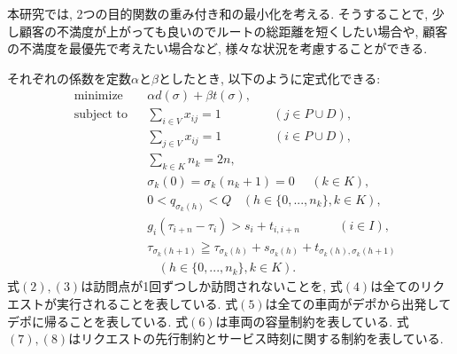 本研究では, 2つの目的関数の重み付き和の最小化を考える. そうすることで, 少し顧客の不満度が上がっても良いのでルートの総距離を短くしたい場合や, 顧客の不満度を最優先で考えたい場合など, 様々な状況を考慮することができる.

それぞれの係数を定数$\alpha$と$\beta$としたとき, 以下のように定式化できる:
\begin{align*}
  &\textrm{minimize}   &&
  \alpha d(\sigma)+ \beta t(\sigma),\tag{1}\\
  &\textrm{subject to} && \sum_{i \in V} x_{ij} = 1 \ \ \ \ \ \ \ \ \ \ \ \ \ \ \ \ \ \ \ (j \in  P \cup D), \tag{2}\\
  &                    && \sum_{j \in V} x_{ij} = 1 \ \ \ \ \ \ \ \ \ \ \ \ \ \ \ \ \ \ \ (i \in  P \cup D), \tag{3}\\
  &                    && \sum_{k \in K} n_k = 2n,\tag{4}\\
  &                    && \sigma_k(0) = \sigma_k(n_k+1) = 0 \ \ \ \ \ \ (k \in K),\tag{5}\\
  &                    && 0 < q_{\sigma_k(h)} < Q\ \ \ \
  (h \in \{0,...,n_k\},k \in K),\tag{6}\\
  &                    && g_i(\tau_{i+n}-\tau_i) > s_i + t_{i,i+n}\ \ \ \ \ \ \ \ \ \ \ \ \ \  (i \in I),\tag{7}\\
  &                    && \tau_ {\sigma_k (h+1)} \geqq \tau_ {\sigma_k (h)} + s_{\sigma_k (h)} + t_ {\sigma_k (h),\sigma_k (h+1)}\\
  &                    &&  \ \ \ \ (h \in \{0,...,n_k\},k \in K).\tag{8}
\end{align*}
式$(2),(3)$は訪問点が1回ずつしか訪問されないことを, 式$(4)$は全てのリクエストが実行されることを表している. 式$(5)$は全ての車両がデポから出発してデポに帰ることを表している. 式$(6)$は車両の容量制約を表している. 式$(7),(8)$はリクエストの先行制約とサービス時刻に関する制約を表している.

